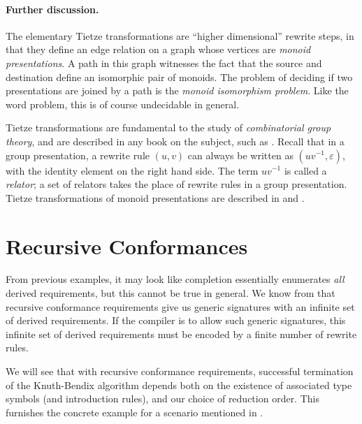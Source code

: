 \documentclass[../generics]{subfiles}
\begin{document}
\paragraph{Further discussion.}
The elementary Tietze transformations are ``higher dimensional'' rewrite steps, in that they define an edge relation on a graph whose vertices are \emph{monoid presentations}. A path in this graph witnesses the fact that the source and destination define an isomorphic pair of monoids. The problem of deciding if two presentations are joined by a path is the \emph{monoid isomorphism problem}. Like the word problem, this is of course undecidable in general.

Tietze transformations are fundamental to the study of \emph{combinatorial group theory}, and are described in any book on the subject, such as \cite{combinatorialgroup}. Recall that in a group presentation, a rewrite rule $(u, v)$ can always be written as $(uv^{-1},\varepsilon)$, with the identity element on the right hand side. The term $uv^{-1}$ is called a \emph{relator}; a set of relators takes the place of rewrite rules in a group presentation. Tietze transformations of monoid presentations are described in \cite{book2012string} and \cite{henry2021tietze}.

\section{Recursive Conformances}\label{recursive conformances redux}

From previous examples, it may look like completion essentially enumerates \emph{all} derived requirements, but this cannot be true in general. We know from  that recursive conformance requirements give us generic signatures with an infinite set of derived requirements. If the compiler is to allow such generic signatures, this infinite set of derived requirements must be encoded by a finite number of rewrite rules.

We will see that with recursive conformance requirements, successful termination of the Knuth-Bendix algorithm depends both on the existence of associated type symbols (and introduction rules), and our choice of reduction order. This furnishes the concrete example for a scenario mentioned in .
\end{document}
